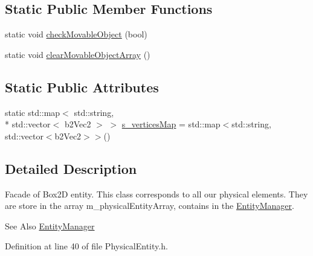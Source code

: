 \subsection*{Static Public Member Functions}
\begin{DoxyCompactItemize}
\item 
static void \hyperlink{class_symp_1_1_physical_entity_aa2d599780090c1c0880ea9d831ce7559}{check\-Movable\-Object} (bool)
\item 
static void \hyperlink{class_symp_1_1_physical_entity_ab286b5332b3efbc0a5539560e3b01a90}{clear\-Movable\-Object\-Array} ()
\end{DoxyCompactItemize}
\subsection*{Static Public Attributes}
\begin{DoxyCompactItemize}
\item 
static std\-::map$<$ std\-::string, \\*
std\-::vector$<$ b2\-Vec2 $>$ $>$ \hyperlink{class_symp_1_1_physical_entity_a91decceca101b25779e6839a0866b6b0}{s\-\_\-vertices\-Map} = std\-::map$<$std\-::string, std\-::vector$<$b2\-Vec2$>$$>$()
\end{DoxyCompactItemize}


\subsection{Detailed Description}
Facade of Box2\-D entity. This class corresponds to all our physical elements. They are store in the array m\-\_\-physical\-Entity\-Array, contains in the \hyperlink{class_symp_1_1_entity_manager}{Entity\-Manager}. \begin{DoxySeeAlso}{See Also}
\hyperlink{class_symp_1_1_entity_manager}{Entity\-Manager} 
\end{DoxySeeAlso}


Definition at line 40 of file Physical\-Entity.\-h.



